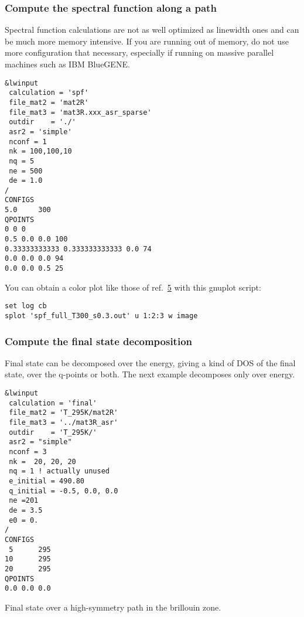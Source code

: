 \documentclass[
]{article}
\begin{document}
\hypertarget{compute-the-spectral-function-along-a-path}{%
\subsubsection{Compute the spectral function along a
path}\label{compute-the-spectral-function-along-a-path}}

Spectral function calculations are not as well optimized as linewidth
ones and can be much more memory intensive. If you are running out of
memory, do not use more configuration that necessary, especially if
running on massive parallel machines such as IBM BlueGENE.

\begin{verbatim}
&lwinput 
 calculation = 'spf'
 file_mat2 = 'mat2R' 
 file_mat3 = 'mat3R.xxx_asr_sparse' 
 outdir    = './' 
 asr2 = 'simple' 
 nconf = 1
 nk = 100,100,10 
 nq = 5 
 ne = 500
 de = 1.0
/ 
CONFIGS 
5.0     300 
QPOINTS 
0 0 0 
0.5 0.0 0.0 100 
0.33333333333 0.333333333333 0.0 74 
0.0 0.0 0.0 94 
0.0 0.0 0.5 25
\end{verbatim}

You can obtain a color plot like those of
ref.~\protect\hyperlink{ref5}{5} with this gnuplot script:

\begin{verbatim}
set log cb 
splot 'spf_full_T300_s0.3.out' u 1:2:3 w image
\end{verbatim}

\hypertarget{compute-the-final-state-decomposition}{%
\subsubsection{Compute the final state
decomposition}\label{compute-the-final-state-decomposition}}

Final state can be decomposed over the energy, giving a kind of DOS of
the final state, over the q-points or both. The next example decomposes
only over energy.

\begin{verbatim}
&lwinput 
 calculation = 'final' 
 file_mat2 = 'T_295K/mat2R' 
 file_mat3 = '../mat3R_asr' 
 outdir    = 'T_295K/' 
 asr2 = "simple"
 nconf = 3 
 nk =  20, 20, 20 
 nq = 1 ! actually unused
 e_initial = 490.80 
 q_initial = -0.5, 0.0, 0.0 
 ne =201 
 de = 3.5 
 e0 = 0. 
/ 
CONFIGS 
 5      295 
10      295 
20      295 
QPOINTS 
0.0 0.0 0.0
\end{verbatim}

Final state over a high-symmetry path in the brillouin zone.
\end{document}
